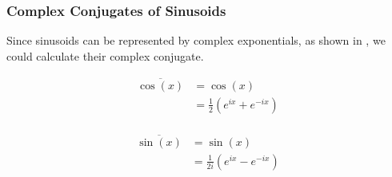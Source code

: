 \subsubsection{Complex Conjugates of Sinusoids}\label{app:Sinusoid_Complex_Conjugates}
Since sinusoids can be represented by complex exponentials, as shown in , we could calculate their complex conjugate.

\begin{equation}\label{eq:Sinusoid_Complex_Conjugate-Cosine}
  \begin{aligned}
    \overline{\cos(x)} &= \cos(x) \\
    &= \frac{1}{2} \left( e^{ix} + e^{-ix} \right) \\
  \end{aligned}
\end{equation}

\begin{equation}\label{eq:Sinusoid_Complex_Conjugate-Sine}
  \begin{aligned}
    \overline{\sin(x)} &= \sin(x) \\
    &= \frac{1}{2i} \left( e^{ix} - e^{-ix} \right) \\
  \end{aligned}
\end{equation}

